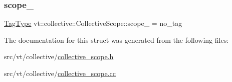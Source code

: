 \mbox{\label{structvt_1_1collective_1_1_collective_scope_a6a1b0fe51f68913bd2aeaed363a5eab9}} 
\subsubsection{\texorpdfstring{scope\+\_\+}{scope\_}}
{\footnotesize\ttfamily \hyperlink{namespacevt_a84ab281dae04a52a4b243d6bf62d0e52}{Tag\+Type} vt\+::collective\+::\+Collective\+Scope\+::scope\+\_\+ = no\+\_\+tag\hspace{0.3cm}{\ttfamily [private]}}



The documentation for this struct was generated from the following files\+:\begin{DoxyCompactItemize}
\item 
src/vt/collective/\hyperlink{collective__scope_8h}{collective\+\_\+scope.\+h}\item 
src/vt/collective/\hyperlink{collective__scope_8cc}{collective\+\_\+scope.\+cc}\end{DoxyCompactItemize}
